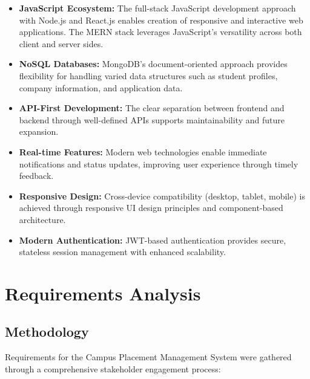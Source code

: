 \documentclass[12pt,a4paper]{report}
\begin{document}
\begin{itemize}
    \item \textbf{JavaScript Ecosystem:} The full-stack JavaScript development approach with Node.js and React.js enables creation of responsive and interactive web applications. The MERN stack leverages JavaScript's versatility across both client and server sides.
    
    \item \textbf{NoSQL Databases:} MongoDB's document-oriented approach provides flexibility for handling varied data structures such as student profiles, company information, and application data.
    
    \item \textbf{API-First Development:} The clear separation between frontend and backend through well-defined APIs supports maintainability and future expansion.
    
    \item \textbf{Real-time Features:} Modern web technologies enable immediate notifications and status updates, improving user experience through timely feedback.
    
    \item \textbf{Responsive Design:} Cross-device compatibility (desktop, tablet, mobile) is achieved through responsive UI design principles and component-based architecture.
    
    \item \textbf{Modern Authentication:} JWT-based authentication provides secure, stateless session management with enhanced scalability.
\end{itemize}

\chapter{Requirements Analysis}

\section{Methodology}
Requirements for the Campus Placement Management System were gathered through a comprehensive stakeholder engagement process:
\end{document}
